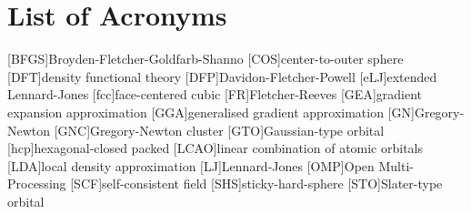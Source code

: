 
\chapter*{List of Acronyms}

\begin{acronym}[ABCDEFGHIJK]
    [BFGS]{Broyden-Fletcher-Goldfarb-Shanno}
    [COS]{center-to-outer sphere}
    [DFT]{density functional theory}
    [DFP]{Davidon-Fletcher-Powell}
    [eLJ]{extended Lennard-Jones}
    [fcc]{face-centered cubic}
    [FR]{Fletcher-Reeves}
	[GEA]{gradient expansion approximation}
	[GGA]{generalised gradient approximation}
    [GN]{Gregory-Newton}
    [GNC]{Gregory-Newton cluster}
    [GTO]{Gaussian-type orbital}
    [hcp]{hexagonal-closed packed}
    [LCAO]{linear combination of atomic orbitals}
    [LDA]{local density approximation}
    [LJ]{Lennard-Jones}
    [OMP]{Open Multi-Processing}
    [SCF]{self-consistent field}
    [SHS]{sticky-hard-sphere}
    [STO]{Slater-type orbital}
\end{acronym}
